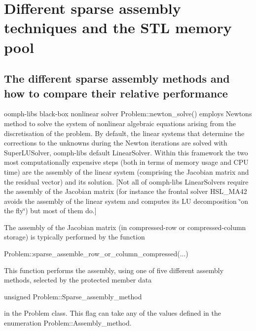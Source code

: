 \hypertarget{index_assembly}{}\section{Different sparse assembly techniques and the S\+T\+L memory pool}\label{index_assembly}
\hypertarget{index_assembly_methods}{}\subsection{The different sparse assembly methods and how to compare their relative performance}\label{index_assembly_methods}
{\ttfamily oomph-\/lib\textquotesingle{}s} black-\/box nonlinear solver {\ttfamily Problem\+::newton\+\_\+solve()} employs Newton\textquotesingle{}s method to solve the system of nonlinear algebraic equations arising from the discretisation of the problem. By default, the linear systems that determine the corrections to the unknowns during the Newton iterations are solved with {\ttfamily Super\+L\+U\+Solver}, {\ttfamily oomph-\/lib\textquotesingle{}s} default {\ttfamily Linear\+Solver}. Within this framework the two most computationally expensive steps (both in terms of memory usage and C\+PU time) are the assembly of the linear system (comprising the Jacobian matrix and the residual vector) and its solution. \mbox{[}Not all of {\ttfamily oomph-\/lib\textquotesingle{}s} {\ttfamily Linear\+Solvers} require the assembly of the Jacobian matrix (for instance the frontal solver {\ttfamily H\+S\+L\+\_\+\+M\+A42} avoids the assembly of the linear system and computes its LU decomposition \char`\"{}on the fly\char`\"{}) but most of them do.\mbox{]}

The assembly of the Jacobian matrix (in compressed-\/row or compressed-\/column storage) is typically performed by the function


\begin{DoxyCode}
Problem::sparse\_assemble\_row\_or\_column\_compressed(...)
\end{DoxyCode}


This function performs the assembly, using one of five different assembly methods, selected by the protected member data


\begin{DoxyCode}
\textcolor{keywordtype}{unsigned} Problem::Sparse\_assembly\_method
\end{DoxyCode}


in the {\ttfamily Problem} class. This flag can take any of the values defined in the enumeration {\ttfamily Problem\+::\+Assembly\+\_\+method}.

